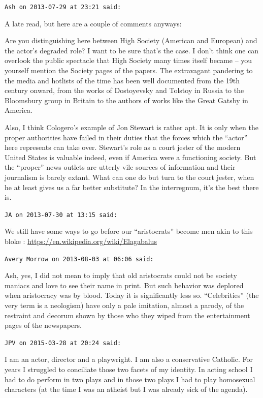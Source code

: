 \begin{footnotesize}
\begin{sffamily}
\hfill

\texttt{Ash on 2013-07-29 at 23:21 said:}

A late read, but here are a couple of comments anyways:

Are you distinguishing here between High Society (American and European) and the actor's degraded role? I want to be sure that's the case. I don't think one can overlook the public spectacle that High Society many times itself became -- you yourself mention the Society pages of the papers. The extravagant pandering to the media and hotlists of the time has been well documented from the 19th century onward, from the works of Dostoyevsky and Tolstoy in Russia to the Bloomsbury group in Britain to the authors of works like the Great Gatsby in America.

Also, I think Cologero's example of Jon Stewart is rather apt. It is only when the proper authorities have failed in their duties that the forces which the ``actor'' here represents can take over. Stewart's role as a court jester of the modern United States is valuable indeed, even if America were a functioning society. But the ``proper'' news outlets are utterly vile sources of information and their journalism is barely extant. What can one do but turn to the court jester, when he at least gives us a far better substitute? In the interregnum, it's the best there is.

\hfill

\texttt{JA on 2013-07-30 at 13:15 said:}

We still have some ways to go before our ``aristocrats'' become men akin to this bloke : \url{https://en.wikipedia.org/wiki/Elagabalus}

\hfill

\texttt{Avery Morrow on 2013-08-03 at 06:06 said:}

Ash, yes, I did not mean to imply that old aristocrats could not be society maniacs and love to see their name in print. But such behavior was deplored when aristocracy was by blood. Today it is significantly less so. ``Celebrities'' (the very term is a neologism) have only a pale imitation, almost a parody, of the restraint and decorum shown by those who they wiped from the entertainment pages of the newspapers.

\hfill

\texttt{JPV on 2015-03-28 at 20:24 said:}

I am an actor, director and a playwright. I am also a conservative Catholic. For years I struggled to conciliate those two facets of my identity. In acting school I had to do perform in two plays and in those two plays I had to play homosexual characters (at the time I was an atheist but I was already sick of the agenda).


\end{sffamily}
\end{footnotesize}
